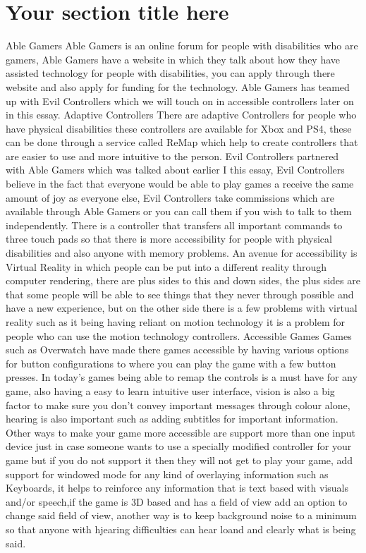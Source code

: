 \documentclass{scrartcl}
\begin{document}
\section{Your section title here}
Able Gamers
Able Gamers is an online forum for people with disabilities who are gamers, Able Gamers have a website in which they talk about how they have assisted technology for people with disabilities, you can apply through there website and also apply for funding for the technology.
Able Gamers has teamed up with Evil Controllers which we will touch on in accessible controllers later on in this essay.
Adaptive Controllers
There are adaptive Controllers for people who have physical disabilities these controllers are available for Xbox and PS4, these can be done through a service called ReMap which help to create controllers that are easier to use and more intuitive to the person.
Evil Controllers partnered with Able Gamers which was talked about earlier I this essay, Evil Controllers believe in the fact that everyone would be able to play games a receive the same amount of joy as everyone else, Evil Controllers take commissions which are available through Able Gamers or you can call them if you wish to talk to them independently.
There is a controller that transfers all important commands to three touch pads so that there is more accessibility for people with physical disabilities and also anyone with memory problems.
An avenue for accessibility is Virtual Reality in which people can be put into a different reality through computer rendering, there are plus sides to this and down sides, the plus sides are that some people will be able to see things that they never through possible and have a new experience, but on the other side there is a few problems with virtual reality such as it being having reliant on motion  technology it is a problem for people who can use the motion technology controllers.
Accessible Games
Games such as Overwatch have made there games accessible by having various options for button configurations to where you can play the game with a few button presses.
In today's games being able to remap the controls is a must have for any game, also having a easy to learn intuitive user interface, vision is also  a big factor to make sure you don't convey important messages through colour alone, hearing is also important such as adding subtitles for important information.
Other ways to make your game more accessible are support more than one input device just in case someone wants to use a specially modified controller for your game but if you do not support it then they will not get to play your game, add support for windowed mode for any kind of overlaying information such as Keyboards, it helps to reinforce any information that is text based with visuals and/or speech,if the game is 3D based and has a field of view add an option to change said field of view, another way is to keep background noise to a minimum so that anyone with hjearing difficulties can hear loand and clearly what is being said.
\end{document}

